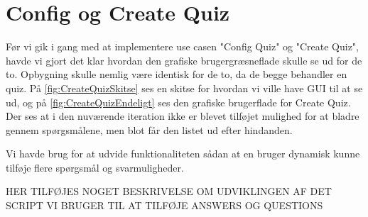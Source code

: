 \section{Config og Create Quiz}
Før vi gik i gang med at implementere use casen "Config Quiz" og "Create Quiz", havde vi gjort det klar hvordan den grafiske brugergræsneflade skulle se ud for de to. Opbygning skulle nemlig være identisk for de to, da de begge behandler en quiz. På \ref{fig:CreateQuizSkitse} ses en skitse for hvordan vi ville have GUI til at se ud, og på \ref{fig:CreateQuizEndeligt} ses den grafiske brugerflade for Create Quiz. Der ses at i den nuværende iteration ikke er blevet tilføjet mulighed for at bladre gennem spørgsmålene, men blot får den listet ud efter hindanden.

\begin{minipage}{0.45\textwidth}
\end{minipage}
\begin{minipage}{0.55\textwidth}
\end{minipage}

\vspace{6 mm}

Vi havde brug for at udvide funktionaliteten sådan at en bruger dynamisk kunne tilføje flere spørgsmål og svarmuligheder.

HER TILFØJES NOGET BESKRIVELSE OM UDVIKLINGEN AF DET SCRIPT VI BRUGER TIL AT TILFØJE ANSWERS OG QUESTIONS